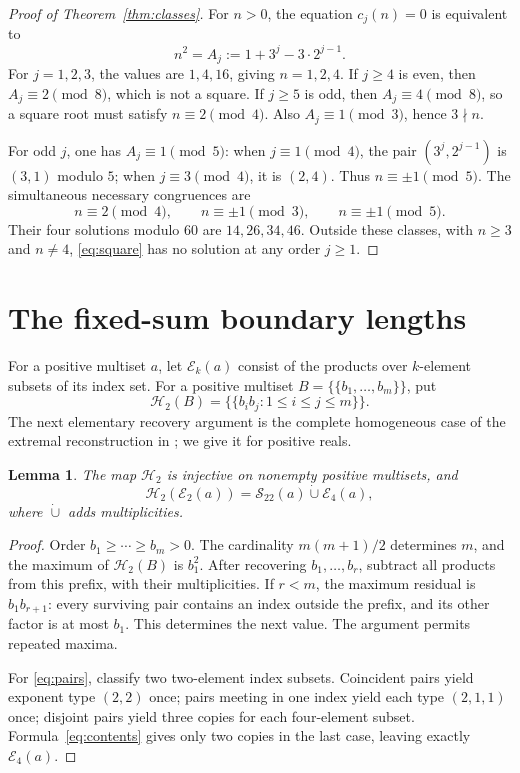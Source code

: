 \documentclass[11pt]{amsart}
\newtheorem{lemma}[theorem]{Lemma}
\theoremstyle{remark}
\newcommand{\Sxx}{\mathcal{S}_{22}}
\begin{document}
\begin{proof}[Proof of Theorem~\ref{thm:classes}]
For $n>0$, the equation $c_j(n)=0$ is equivalent to
\begin{equation}\label{eq:square}
 n^2=A_j:=1+3^j-3\cdot2^{j-1}.
\end{equation}
For $j=1,2,3$, the values are $1,4,16$, giving $n=1,2,4$.
If $j\geq4$ is even, then $A_j\equiv2\pmod8$, which is not a square.
If $j\geq5$ is odd, then $A_j\equiv4\pmod8$, so a square root
must satisfy $n\equiv2\pmod4$. Also $A_j\equiv1\pmod3$, hence
$3\nmid n$.

For odd $j$, one has $A_j\equiv1\pmod5$: when $j\equiv1\pmod4$,
the pair $(3^j,2^{j-1})$ is $(3,1)$ modulo $5$; when
$j\equiv3\pmod4$, it is $(2,4)$. Thus $n\equiv\pm1\pmod5$.
The simultaneous necessary congruences are
\[
 n\equiv2\pmod4,\qquad n\equiv\pm1\pmod3,
 \qquad n\equiv\pm1\pmod5.
\]
Their four solutions modulo $60$ are $14,26,34,46$. Outside these
classes, with $n\geq3$ and $n\ne4$, \eqref{eq:square} has no solution
at any order $j\geq1$.
\end{proof}

\section{The fixed-sum boundary lengths}

For a positive multiset $a$, let $\mathcal E_k(a)$ consist of the products
over $k$-element subsets of its index set. For a positive multiset
$B=\{\!\{b_1,\ldots,b_m\}\!\}$, put
\[
 \mathcal H_2(B)=\{\!\{b_i b_j:1\leq i\leq j\leq m\}\!\}.
\]
The next elementary recovery argument is the complete homogeneous
case of the extremal reconstruction in
\cite[Theorem~5.1]{HadelynEtAl2026}; we give it for positive reals.

\begin{lemma}\label{lem:pair}
The map $\mathcal H_2$ is injective on nonempty positive multisets, and
\begin{equation}\label{eq:pairs}
 \mathcal H_2(\mathcal E_2(a))=\Sxx(a)\mathbin{\dot{\cup}}\mathcal E_4(a),
\end{equation}
where $\mathbin{\dot{\cup}}$ adds multiplicities.
\end{lemma}

\begin{proof}
Order $b_1\geq\cdots\geq b_m>0$. The cardinality $m(m+1)/2$
determines $m$, and the maximum of $\mathcal H_2(B)$ is $b_1^2$.
After recovering $b_1,\ldots,b_r$, subtract all products from this
prefix, with their multiplicities. If $r<m$, the maximum residual is
$b_1b_{r+1}$: every surviving pair contains an index outside the prefix,
and its other factor is at most $b_1$. This determines the next value.
The argument permits repeated maxima.

For \eqref{eq:pairs}, classify two two-element index subsets. Coincident
pairs yield exponent type $(2,2)$ once; pairs meeting in one index yield
each type $(2,1,1)$ once; disjoint pairs yield three copies for each
four-element subset. Formula~\eqref{eq:contents} gives only two copies
in the last case, leaving exactly $\mathcal E_4(a)$.
\end{proof}
\end{document}
